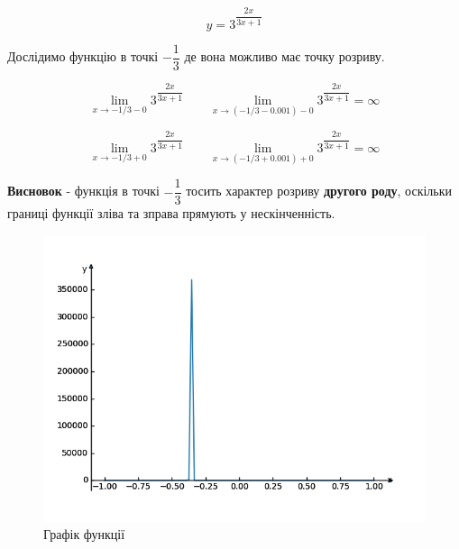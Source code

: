 {}

$$
y=3^{\dfrac{2x}{3x+1}}
$$

Дослідимо функцію в точкі $-\dfrac{1}{3}$ де вона можливо має точку розриву.


$$
  \lim_{x \to -1/3 -0} 3^{\dfrac{2x}{3x+1}} \qquad \lim_{x \to (-1/3-0.001) -0} 3^{\dfrac{2x}{3x+1}} = \infty
$$

$$
  \lim_{x \to -1/3 +0} 3^{\dfrac{2x}{3x+1}} \qquad \lim_{x \to (-1/3+0.001) +0} 3^{\dfrac{2x}{3x+1}} = \infty
$$

\textbf{Висновок} - функція в точкі $-\dfrac{1}{3}$ тосить характер розриву \textbf{другого роду}, оскільки границі функції зліва та зправа прямують у нескінченність.


\begin{figure}[h!]
  \centering
  \includegraphics[width=14cm]{rozrahunkova_01/04_02.png}
  \caption{Графік функції}
  \label{fig:rr_01_40_02}
  \centering
\end{figure}
